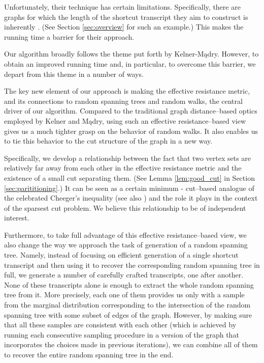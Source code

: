 \documentclass[11pt, letterpaper]{article}
\begin{document}
Unfortunately, their technique has certain limitations. Specifically, there are graphs for which the length of the shortcut transcript they aim to construct is inherently . (See Section \ref{sec:overview} for such an example.) This makes the  running time a barrier for their approach.

Our algorithm broadly follows the theme put forth by Kelner-Mądry. However, to obtain an improved running time and, in particular, to overcome this  barrier, we depart from this theme in a number of ways. 

The key new element of our approach is making the effective resistance metric, and its connections to random spanning trees and random walks, the central driver of our algorithm. Compared to the traditional graph distance--based optics employed by Kelner and Mądry, using such an effective resistance--based view gives us a much tighter grasp on the behavior of random walks. It also enables us to tie this behavior to the cut structure of the graph in a new way. 

Specifically, we develop a relationship between the fact that two vertex sets are relatively far away from each other in the effective resistance metric and the existence of a small cut separating them. (See Lemma \ref{lem:good_cut} in Section \ref{sec:parititioning}.)  It can be seen as a certain minimum - cut--based analogue of the celebrated Cheeger's inequality \cite{AlonM85,Alon86} (see also \cite{KwokLLOT13}) and the role it plays in the context of the sparsest cut problem. We believe this relationship to be of independent interest.

Furthermore, to take full advantage of this effective resistance--based view, we also change the way we approach the task of generation of a random spanning tree. Namely, instead of focusing on efficient generation of a single shortcut transcript and then using it to recover the corresponding random spanning tree in full, we generate a number of carefully crafted transcripts, one after another. None of these transcripts alone is enough to extract the whole random spanning tree from it. More precisely, each one of them provides us only with a sample from the marginal distribution corresponding to the intersection of the random spanning tree with some subset of edges of the graph. However, by making sure that all these samples are consistent with each other (which is achieved by running each consecutive sampling procedure in a version of the graph that incorporates the choices made in previous iterations), we can combine all of them to recover the entire random spanning tree in the end. 
 
\end{document}
